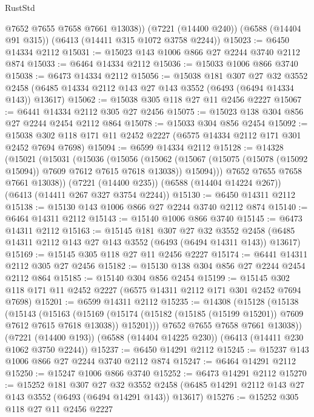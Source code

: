 \begin{lexlean}{RustStd}
\begin{coremodule}
        @7652
        @7655
        @7658
        @7661
        @13038))
    (@7221 (@14400 @240))
    (@6588 (@14404 @91 @315))
    (@6413 (@14411 @315 @1072 @3758 @2244))
@15023 := @6450 @14334 @2112
@15031 := @15023 @143 @1006 @866 @27 @2244 @3740 @2112 @874
@15033 := @6464 @14334 @2112
@15036 := @15033 @1006 @866 @3740
@15038 := @6473 @14334 @2112
@15056 := @15038
    @181
    @307
    @27
    @32
    @3552
    @2458
    (@6485 @14334 @2112 @143 @27 @143 @3552 (@6493 (@6494 @14334 @143)) @13617)
@15062 := @15038 @305 @118 @27 @11 @2456 @2227
@15067 := @6441 @14334 @2112 @305 @27 @2456
@15075 := @15023 @138 @304 @856 @27 @2244 @2454 @2112 @864
@15078 := @15033 @304 @856 @2454
@15092 := @15038 @302 @118 @171 @11 @2452 @2227 (@6575 @14334 @2112 @171 @301 @2452 @7694 @7698)
@15094 := @6599 @14334 @2112
@15128 := @14328
    (@15021
      (@15031
        (@15036
          (@15056
            (@15062
              (@15067 (@15075 (@15078 (@15092 @15094)) @7609 @7612 @7615 @7618 @13038))
              @15094)))
        @7652
        @7655
        @7658
        @7661
        @13038))
    (@7221 (@14400 @235))
    (@6588 (@14404 @14224 @267))
    (@6413 (@14411 @267 @327 @3754 @2244))
@15130 := @6450 @14311 @2112
@15138 := @15130 @143 @1006 @866 @27 @2244 @3740 @2112 @874
@15140 := @6464 @14311 @2112
@15143 := @15140 @1006 @866 @3740
@15145 := @6473 @14311 @2112
@15163 := @15145
    @181
    @307
    @27
    @32
    @3552
    @2458
    (@6485 @14311 @2112 @143 @27 @143 @3552 (@6493 (@6494 @14311 @143)) @13617)
@15169 := @15145 @305 @118 @27 @11 @2456 @2227
@15174 := @6441 @14311 @2112 @305 @27 @2456
@15182 := @15130 @138 @304 @856 @27 @2244 @2454 @2112 @864
@15185 := @15140 @304 @856 @2454
@15199 := @15145 @302 @118 @171 @11 @2452 @2227 (@6575 @14311 @2112 @171 @301 @2452 @7694 @7698)
@15201 := @6599 @14311 @2112
@15235 := @14308
    (@15128
      (@15138
        (@15143
          (@15163
            (@15169
              (@15174 (@15182 (@15185 (@15199 @15201)) @7609 @7612 @7615 @7618 @13038))
              @15201)))
        @7652
        @7655
        @7658
        @7661
        @13038))
    (@7221 (@14400 @193))
    (@6588 (@14404 @14225 @230))
    (@6413 (@14411 @230 @1062 @3750 @2244))
@15237 := @6450 @14291 @2112
@15245 := @15237 @143 @1006 @866 @27 @2244 @3740 @2112 @874
@15247 := @6464 @14291 @2112
@15250 := @15247 @1006 @866 @3740
@15252 := @6473 @14291 @2112
@15270 := @15252
    @181
    @307
    @27
    @32
    @3552
    @2458
    (@6485 @14291 @2112 @143 @27 @143 @3552 (@6493 (@6494 @14291 @143)) @13617)
@15276 := @15252 @305 @118 @27 @11 @2456 @2227

\end{coremodule}
\end{lexlean}
